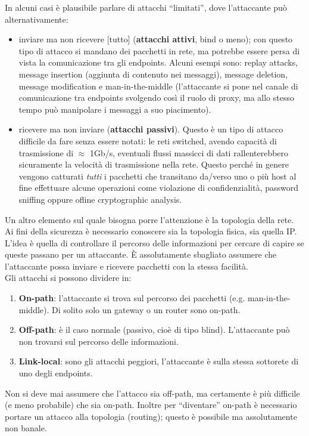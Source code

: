 In alcuni casi è plausibile parlare di attacchi “limitati”, dove l'attaccante può alternativamente:
\begin{itemize}
	\item inviare ma non ricevere [tutto] (\textbf{attacchi attivi}, bind o meno); con questo tipo di attacco si mandano dei pacchetti in rete, ma potrebbe essere persa di vista la comunicazione tra gli endpoints. Alcuni esempi sono: replay attacks, message insertion (aggiunta di contenuto nei messaggi), message deletion, message modification e man-in-the-middle (l'attaccante si pone nel canale di comunicazione tra endpoints svolgendo così il ruolo di proxy, ma allo stesso tempo può manipolare i messaggi a suo piacimento).
	\item ricevere ma non inviare (\textbf{attacchi passivi}). Questo è un tipo di attacco difficile da fare senza essere notati: le reti switched, avendo capacità di trasmissione di $\approx$ 1Gb/s, eventuali flussi massicci di dati rallenterebbero sicuramente la velocità di trasmissione nella rete. Questo perché in genere vengono catturati \textit{tutti} i pacchetti che transitano da/verso uno o più host al fine effettuare alcune operazioni come violazione di confidenzialità, password sniffing oppure ofline cryptographic analysis.
\end{itemize}
Un altro elemento sul quale bisogna porre l'attenzione è la topologia della rete. Ai fini della sicurezza è necessario conoscere sia la topologia fisica, sia quella IP. L'idea è quella di controllare il percorso delle informazioni per cercare di capire se queste passano per un attaccante. È assolutamente sbagliato assumere che l'attaccante possa inviare e ricevere pacchetti con la stessa facilità.\\
Gli attacchi si possono dividere in:
\begin{enumerate}
	\item \textbf{On-path}: l'attaccante si trova sul percorso dei pacchetti (e.g. man-in-the-middle). Di solito solo un gateway o un router sono on-path.
	\item \textbf{Off-path}: è il caso normale (passivo, cioè di tipo blind). L'attaccante può non trovarsi sul percorso delle informazioni.
	\item \textbf{Link-local}: sono gli attacchi peggiori, l'attaccante è sulla stessa sottorete di uno degli endpoints.
\end{enumerate}
Non si deve mai assumere che l'attacco sia off-path, ma certamente è più difficile (e meno probabile) che sia on-path. Inoltre per “diventare” on-path è necessario portare un attacco alla topologia (routing); questo è possibile ma assolutamente non banale.\\
